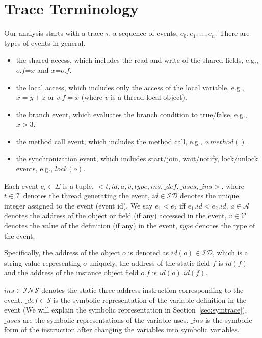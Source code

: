 

\section{Trace Terminology}
Our analysis starts with a trace $\tau$,  a sequence of events, $e_0, e_1, \dots, e_n$.  
There are  types of events in general.
\begin{itemize}
\item the shared access, which includes the read and write of the shared fields, e.g., $o.f$=$x$ and $x$=$o.f$.
\item the local access, which includes only the access of the local variable, e.g., $x=y+z$ or $v.f=x$ (where $v$ is a thread-local object).
\item the branch event, which evaluates the branch condition to true/false, e.g., $x>3$.
\item the method call event, which includes the method call, e.g., $o.method()$.
\item the synchronization event, which includes start/join, wait/notify, lock/unlock events, e.g., $lock(o)$.
\end{itemize}


Each event $e_i \in \Sigma$ is a tuple, $<t, id, a, v, type, ins, \_def, \_uses, \_ins>$, where $t\in \mathcal{T}$ denotes the thread generating the event, $id\in \mathcal{ID}$ denotes the unique integer assigned to the event (event id). We say $e_1 < e_2$ iff $e_1.id<e_2.id$. $a\in \mathcal{A}$ denotes the address of the object or field (if any) accessed in the event,  $v\in \mathcal{V}$ denotes the value of the definition (if any) in the event, $type$ denotes the type of the event.

Specifically, the address of the object $o$ is denoted as $id(o)\in \mathcal{ID}$, which is a string value representing $o$ uniquely, the address of the static field $f$ is  $id(f)$ and the address of the instance object field $o.f$ is  $id(o).id(f)$. 


$ins\in \mathcal{INS}$ denotes the static three-address instruction corresponding to the event.  $\_def \in \mathcal{S}$ is the symbolic representation of the variable definition  in the event (We will explain the symbolic representation in Section~\ref{sec:symtrace}). $\_uses$ are the symbolic representations of the variable uses. $\_ins$ is the symbolic form of the instruction after changing the variables into symbolic variables.


